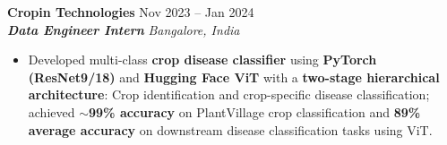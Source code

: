 \documentclass[10pt,a4paper]{article}
\newcommand{\resumeSubheading}[4]{
    \textbf{#1} \hfill #2 \\
    \textit{#3} \hfill \textit{#4}
}
\begin{document}
\resumeSubheading
{Cropin Technologies}
{Nov 2023 -- Jan 2024}
{\textbf{Data Engineer Intern}}
{Bangalore, India}
\begin{itemize}[leftmargin=*,
itemsep=1pt,
topsep=0pt,
parsep=0pt,
partopsep=0pt]


\item Developed multi-class \textbf{crop disease classifier} using \textbf{PyTorch (ResNet9/18)} and \textbf{Hugging Face ViT} with a \textbf{two-stage hierarchical architecture}: Crop identification and crop-specific disease classification; achieved \textbf{$\sim$99\% accuracy} on PlantVillage crop classification and \textbf{89\% average accuracy} on downstream disease classification tasks using ViT.




\end{itemize}


\end{document}
